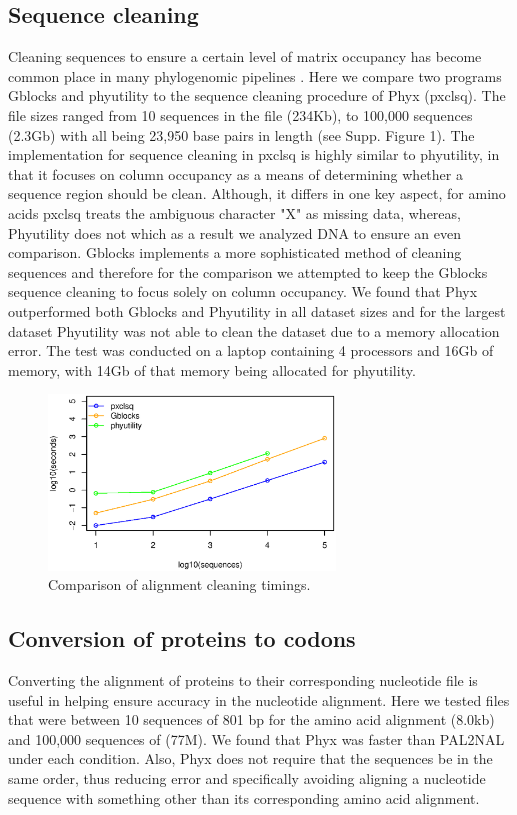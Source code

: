 \documentclass{article}
\begin{document}
\subsection{Sequence cleaning}
Cleaning sequences to ensure a certain level of matrix occupancy has become common place in many phylogenomic pipelines \citep{Dunn2013,YangSmith2014}. Here we compare two programs Gblocks \citep{Gblocks} and phyutility \citep{SmithDunn2008} to the sequence cleaning procedure of Phyx (pxclsq). The file sizes ranged from 10 sequences in the file (234Kb), to 100,000 sequences (2.3Gb) with all being 23,950 base pairs in length (see Supp. Figure 1). The implementation for sequence cleaning in pxclsq is highly similar to phyutility, in that it focuses on column occupancy as a means of determining whether a sequence region should be clean. Although, it differs in one key aspect, for amino acids pxclsq treats the ambiguous character "X" as missing data, whereas, Phyutility does not which as a result we analyzed DNA to ensure an even comparison. Gblocks implements a more sophisticated method of cleaning sequences and therefore for the comparison we attempted to keep the Gblocks sequence cleaning to focus solely on column occupancy. We found that Phyx outperformed both Gblocks and Phyutility in all dataset sizes and for the largest dataset Phyutility was not able to clean the dataset due to a memory allocation error. The test was conducted on a laptop  containing 4 processors and 16Gb of memory, with 14Gb of that memory being allocated for phyutility.

\begin{figure}[H]
    \centering
    \includegraphics[width=3.0in]{clsq.eps}
    \caption{Comparison of alignment cleaning timings.}
    \label{cleaningfigure}
\label{fig:S1}
\end{figure}

\subsection{Conversion of proteins to codons}
Converting the alignment of proteins to their corresponding nucleotide file is useful in helping ensure accuracy in the nucleotide alignment. Here we tested files that were between 10 sequences of 801 bp for the amino acid alignment (8.0kb) and 100,000 sequences of (77M). We found that Phyx was faster than PAL2NAL \citep{Suyama2006} under each condition. Also, Phyx does not require that the sequences be in the same order, thus reducing error and specifically avoiding aligning a nucleotide sequence with something other than its corresponding amino acid alignment.
\end{document}

